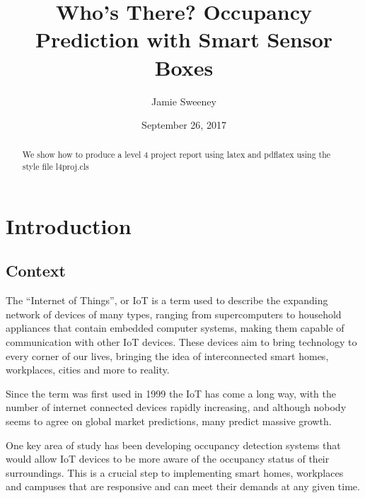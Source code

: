 \documentclass{l4proj}
\begin{document}
\title{Who's There? Occupancy Prediction with Smart Sensor Boxes}
\author{Jamie Sweeney}
\date{September 26, 2017}
\maketitle

\begin{abstract}
We show how to produce a level 4 project report using latex and pdflatex using the 
style file l4proj.cls
\end{abstract}

\educationalconsent
%
%
\tableofcontents



\chapter{Introduction}


\section{Context}
The “Internet of Things”, or IoT is a term used to describe the expanding network of devices of many types,  ranging from supercomputers to household appliances that contain embedded computer systems, making them capable of communication with other IoT devices. These devices aim to bring technology to every corner of our lives, bringing the idea of interconnected smart homes, workplaces, cities and more to reality.

Since the term was first used in 1999\cite{c-iot-term} the IoT has come a long way,  with the number of internet connected devices rapidly increasing\cite{c-devices}, and although nobody seems to agree on global market predictions, many predict massive growth\cite{c-iot-market1}\cite{c-iot-market2}\cite{c-iot-market3}.

One key area of study has been developing occupancy detection systems that would allow IoT devices to be more aware of the occupancy status of their surroundings. This is a crucial step to implementing smart homes, workplaces and campuses that are responsive and can meet their demands at any given time.
\end{document}
